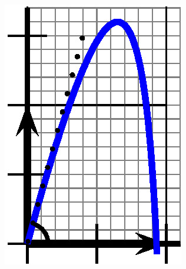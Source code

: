 \documentclass{cornouaille}
\begin{document}

\includegraphics{./TS-Complexes-Loga-2}
\end{document}
